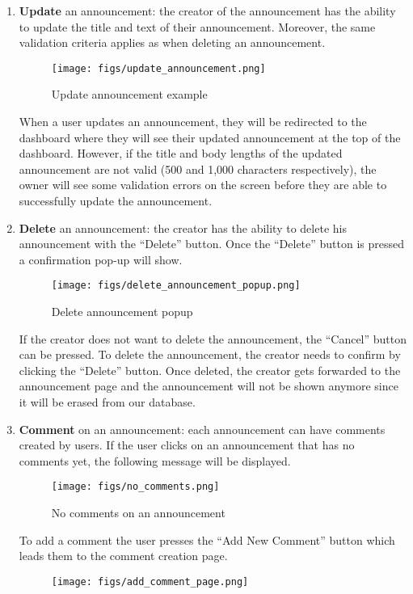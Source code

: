 \documentclass[conference]{IEEEtran}
\begin{document}
\begin{enumerate}
\begin{figure}[H]
    \end{figure}
    \item \textbf{Update} an announcement: the creator of the announcement has the ability to update the title and text of their announcement. Moreover, the same validation criteria applies as when deleting an announcement.
    \begin{figure}[H]
    \centering
    \texttt{[image: figs/update\_announcement.png]}
    \caption{Update announcement example}
    \label{fig:Update announcement example}
    \end{figure}
    When a user updates an announcement, they will be redirected to the dashboard where they will see their updated announcement at the top of the dashboard. However, if the title and body lengths of the updated announcement are not valid (500 and 1,000 characters respectively), the owner will see some validation errors on the screen before they are able to successfully update the announcement.
    \item \textbf{Delete} an announcement: the creator has the ability to delete his announcement with the “Delete” button. Once the “Delete” button is pressed a confirmation pop-up will show.
    \begin{figure}[H]
    \centering
    \texttt{[image: figs/delete\_announcement\_popup.png]}
    \caption{Delete announcement popup}
    \label{fig:Delete announcement popup}
    \end{figure}
    If the creator does not want to delete the announcement, the “Cancel” button can be pressed. To delete the announcement, the creator needs to confirm by clicking the “Delete” button. Once deleted, the creator gets forwarded to the announcement page and the announcement will not be shown anymore since it will be erased from our database.
    \item \textbf{Comment} on an announcement: each announcement can have comments created by users. If the user clicks on an announcement that has no comments yet, the following message will be displayed.
    \begin{figure}[H]
    \centering
    \texttt{[image: figs/no\_comments.png]}
    \caption{No comments on an announcement}
    \label{fig:No comments on an announcement}
    \end{figure}
    To add a comment the user presses the “Add New Comment” button which leads them to the comment creation page.
    \begin{figure}[H]
    \centering
    \texttt{[image: figs/add\_comment\_page.png]}

\end{figure}
\end{enumerate}
\end{document}
